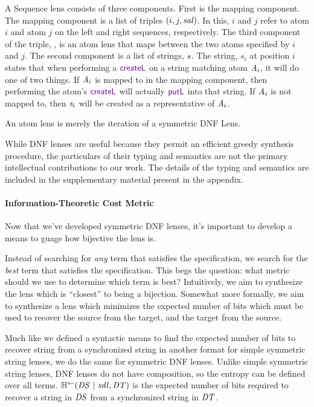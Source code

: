 \documentclass[acmsmall,screen,anonymous]{acmart}
\begin{document}
A Sequence lens \SSQLens{} consists of three components. First is the mapping
component. The mapping component is a list of triples $(i,j,\mathit{sal})$. In
this, $i$ and $j$ refer to atom $i$ and atom $j$ on the left and right
sequences, respectively. The third component of the triple, \SAtomLens{}, is an atom lens that
maps between the two atoms specified by $i$ and $j$. The second component is a
list of strings, $\mathit{s}$. The string, $s_i$ at position $i$ states that when
performing a $\CreateL$ on a string matching atom $\mathit{A}_i$, it will do one of
two things. If $\mathit{A}_i$ is mapped to in the mapping component, then performing
the atom's $\CreateL$ will actually $\PutL$ into that string. If $\mathit{A}_i$ is
not mapped to, then $\mathit{s}_i$ will be created as a representative of
$\mathit{A}_i$.

An atom lens \AtomLens{} is merely the iteration of a symmetric DNF Lens.

While DNF lenses are useful because they permit an efficient greedy synthesis
procedure, the particulars of their typing and semantics are not the primary
intellectual contributions to our work. The details of the typing and semantics
are included in the supplementary material present in the appendix.

\paragraph*{Information-Theoretic Cost Metric}
Now that we've developed symmetric DNF lenses, it's important to develop a means
to guage how bijective the lens is.

Instead of searching for \emph{any} term that satisfies the specification, we
search for the \emph{best} term that satisfies the specification. This begs the
question: what metric should we use to determine which term is best?
Intuitively, we aim to synthesize the lens which is ``closest'' to being a
bijection. Somewhat more formally, we aim to synthesize a lens which minimizes
the expected number of bits which must be used to recover the source from the
target, and the target from the source.

Much like we defined a syntactic means to find the expected number of bits to
recover string from a synchronized string in another format for simple symmetric
string lenses, we do the same for symmetric DNF lenses.  Unlike simple symmetric
string lenses, DNF lenses do not have composition, so the entropy can be defined
over all terms.  $\mathbb{H}^\leftarrow(\mathit{DS} ~|~ \mathit{sdl}, \mathit{DT})$ is the
expected number of bits required to recover a string in $\mathit{DS}$ from a
synchronized string in $\mathit{DT}$.
\end{document}
